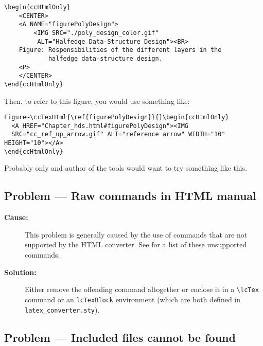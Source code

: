 \begin{description}
\begin{verbatim}
\begin{ccHtmlOnly}
    <CENTER>
    <A NAME="figurePolyDesign">
        <IMG SRC="./poly_design_color.gif"
         ALT="Halfedge Data-Structure Design"><BR>
    Figure: Responsibilities of the different layers in the
            halfedge data-structure design.
    <P>
    </CENTER>
\end{ccHtmlOnly}
\end{verbatim}

Then, to refer to this figure, you would use something like:

\begin{verbatim}
Figure~\ccTexHtml{\ref{figurePolyDesign}}{}\begin{ccHtmlOnly}
  <A HREF="Chapter_hds.html#figurePolyDesign"><IMG
  SRC="cc_ref_up_arrow.gif" ALT="reference arrow" WIDTH="10" HEIGHT="10"></A>
\end{ccHtmlOnly}
\end{verbatim}
Probably only and author of the tools would want to try something like this. 

\end{description}

\subsection*{Problem --- Raw  commands in HTML manual} 

\begin{description}
\item[{\bf Cause:}] This problem is generally caused by the use of commands
that are not supported by the HTML converter.  See 
 for a list of
these unsupported commands.  

\item[{\bf Solution:}] Either remove the offending command altogether or enclose
it in a \verb|\lcTex| command or an {\tt lcTexBlock} environment (which are
both defined in {\tt latex\_converter.sty}). 
\end{description}

\subsection*{Problem --- Included files cannot be found}

